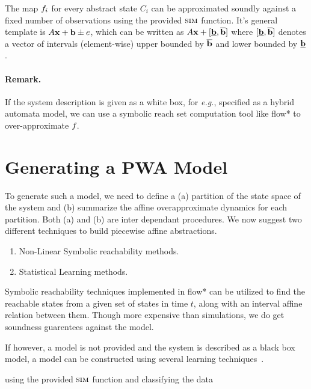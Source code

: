 The map $f_{i}$ for every abstract state $C_i$ can be approximated
soundly against a fixed number of observations using the provided
$\mbox{\sc sim}$ function. It's general template is $A\mathbf{x} + \mathbf{b} \pm e$,
which can be written as $A\mathbf{x} + [\underline{\mathbf{b}}, \overline{\mathbf{b}}]$
where $[\underline{\mathbf{b}}, \overline{\mathbf{b}}]$ denotes a vector of
intervals (element-wise) upper bounded by $\overline{\mathbf{b}}$ and
lower bounded by $\underline{\mathbf{b}}$.

\paragraph{Remark.} If the system description is given as a white box,
for \emph{e.g.}, specified as a hybrid automata model, we can use a
symbolic reach set computation tool like flow* to over-approximate
$f_{}$.


\section{Generating a PWA Model}
\label{sec:gen-pwa}
To generate such a model,
we need to define a (a) partition of the state space of the system and
(b) summarize the affine overapproximate dynamics for each partition.
Both (a) and (b) are inter dependant procedures. We now suggest two
different techniques to build piecewise affine abstractions.
\begin{enumerate}
    \item Non-Linear Symbolic reachability methods.~\label{SRM}
    \item Statistical Learning methods.~\label{SLM}
\end{enumerate}

Symbolic reachability techniques implemented in flow* can be utilized
to find the reachable states from a given set of states in time $t$,
along with an interval affine relation between them. Though more
expensive than simulations, we do get soundness guarentees against the
model.

If however, a model is not provided and the system is described as a
black box model, a model can be constructed using several learning
techniques~\cite{alur2014precise}.

using the provided $\mbox{\sc sim}$ function and classifying the
data
